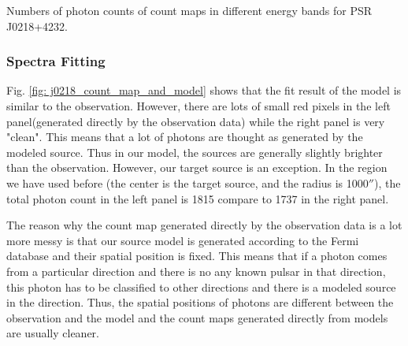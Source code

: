 \documentclass[12pt]{report}
\newcommand{\mycaption}[1]{\protect \caption{#1}}
\begin{document}
          \begin{table}[!h]   
            \centering
            \mycaption{Numbers of photon counts of count maps in different energy bands for PSR J0218+4232.}
            \label{table:j0218_ccube_photon_counts}
          \end{table}
          \subsubsection{Spectra Fitting}
            Fig. \ref{fig: j0218_count_map_and_model} shows that the fit result of the model 
            is similar to the observation. However, 
            there are lots of small red pixels in the left panel(generated directly by the observation 
            data) while the 
            right panel is very "clean". This means that a lot of photons are thought as generated by the 
            modeled 
            source. Thus in our model, the sources are generally slightly brighter than the observation. 
            However, our target
            source is an exception. In the region we have used before (the center is the target source, and 
            the radius is
            1000$''$), the total photon count in the left panel is 1815 compare to 1737 in the right panel. 

            The reason why the count map generated directly by the observation data is a lot more messy is 
            that our source 
            model is generated according to the Fermi database and their spatial position is fixed. This 
            means that if 
            a photon comes from a particular direction and there is no any known pulsar in that direction, 
            this 
            photon has to be classified to other directions and there is a modeled source in the direction.  
            Thus, the spatial positions of photons are different between the observation and the model and 
            the count maps generated directly from models are usually cleaner. 
            
\end{document}
